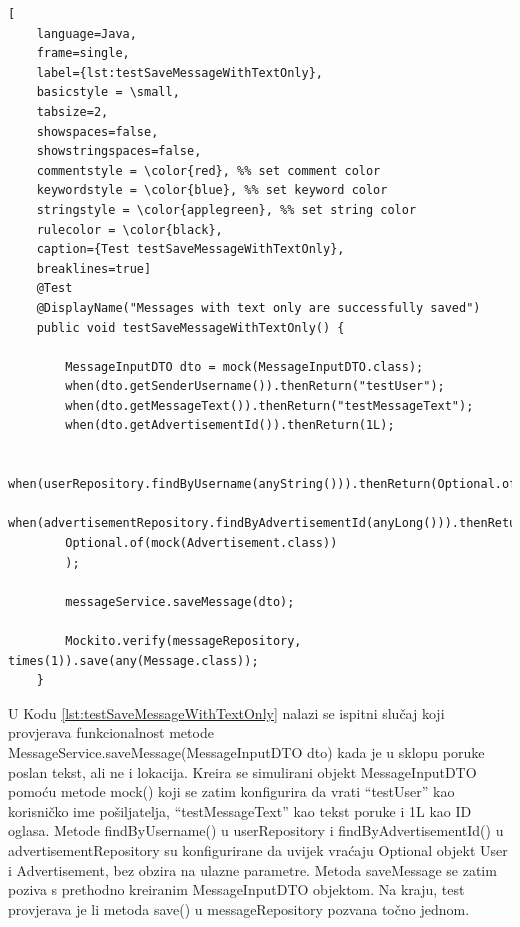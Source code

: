 \pagebreak

\begin{lstlisting}[
	language=Java,
	frame=single,
	label={lst:testSaveMessageWithTextOnly},
	basicstyle = \small,
	tabsize=2,
	showspaces=false,
	showstringspaces=false,
	commentstyle = \color{red}, %% set comment color
	keywordstyle = \color{blue}, %% set keyword color
	stringstyle = \color{applegreen}, %% set string color
	rulecolor = \color{black},
	caption={Test testSaveMessageWithTextOnly},
	breaklines=true]
	@Test
	@DisplayName("Messages with text only are successfully saved")
	public void testSaveMessageWithTextOnly() {
		
		MessageInputDTO dto = mock(MessageInputDTO.class);
		when(dto.getSenderUsername()).thenReturn("testUser");
		when(dto.getMessageText()).thenReturn("testMessageText");
		when(dto.getAdvertisementId()).thenReturn(1L);
		
		when(userRepository.findByUsername(anyString())).thenReturn(Optional.of(mock(User.class)));
		when(advertisementRepository.findByAdvertisementId(anyLong())).thenReturn(
		Optional.of(mock(Advertisement.class))
		);
		
		messageService.saveMessage(dto);
		
		Mockito.verify(messageRepository, times(1)).save(any(Message.class));
	}
\end{lstlisting}

U Kodu \ref{lst:testSaveMessageWithTextOnly} nalazi se ispitni slučaj koji  provjerava funkcionalnost metode MessageService.saveMessage(MessageInputDTO dto) kada je u sklopu poruke poslan tekst, ali ne i lokacija. Kreira se simulirani objekt MessageInputDTO pomoću metode mock() koji se zatim konfigurira da vrati “testUser” kao korisničko ime pošiljatelja, “testMessageText” kao tekst poruke i 1L kao ID oglasa. Metode findByUsername() u userRepository i findByAdvertisementId() u advertisementRepository su konfigurirane da uvijek vraćaju Optional objekt User i Advertisement, bez obzira na ulazne parametre. Metoda saveMessage se zatim poziva s prethodno kreiranim MessageInputDTO objektom. Na kraju, test provjerava je li metoda save() u messageRepository pozvana točno jednom.

\pagebreak

